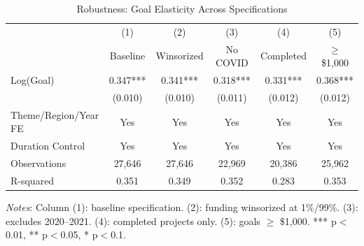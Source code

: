 \begin{table}[htbp]
\centering
\caption{Robustness: Goal Elasticity Across Specifications}
\label{tab:robustness}
\begin{threeparttable}
\begin{tabular}{lccccc}
\toprule
& (1) & (2) & (3) & (4) & (5) \\
& Baseline & Winsorized & No COVID & Completed & $\geq$\$1,000 \\
\midrule
Log(Goal) & 0.347*** & 0.341*** & 0.318*** & 0.331*** & 0.368*** \\
& (0.010) & (0.010) & (0.011) & (0.012) & (0.012) \\
\midrule
Theme/Region/Year FE & Yes & Yes & Yes & Yes & Yes \\
Duration Control & Yes & Yes & Yes & Yes & Yes \\
\midrule
Observations & 27,646 & 27,646 & 22,969 & 20,386 & 25,962 \\
R-squared & 0.351 & 0.349 & 0.352 & 0.283 & 0.353 \\
\bottomrule
\end{tabular}
\begin{tablenotes}
\small
\item \textit{Notes}: Column (1): baseline specification. (2): funding winsorized at 1\%/99\%. (3): excludes 2020--2021. (4): completed projects only. (5): goals $\geq$ \$1,000. *** p$<$0.01, ** p$<$0.05, * p$<$0.1.
\end{tablenotes}
\end{threeparttable}
\end{table}

